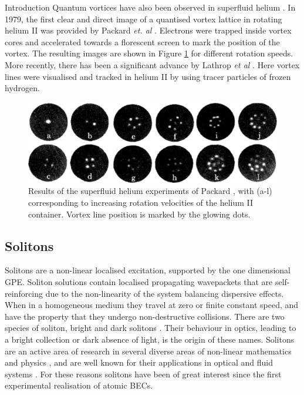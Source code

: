 \begin{chapter}{\label{cha:bose_gases}Introduction}
Quantum vortices have also been observed in superfluid helium \cite{Vinen218}. In 1979, the first clear and direct image of a quantised vortex lattice in rotating helium II was provided by Packard {\it et. al} \cite{PhysRevLett.43.214}. Electrons were trapped inside vortex cores and accelerated towards a florescent screen to mark the position of the vortex. The resulting images are shown in Figure \ref{fig:hevorts} for different rotation speeds. More recently, there has been a significant advance by Lathrop {\it et al} \cite{Bewley09}. Here vortex lines were visualised and tracked in helium II by using tracer particles of frozen hydrogen.

\begin{figure}
\includegraphics[width=\linewidth]{intro/packard}
\caption{\label{fig:hevorts} Results of the superfluid helium experiments of Packard \cite{PhysRevLett.43.214}, with (a-l) corresponding to increasing rotation velocities of the helium II container. Vortex line position is marked by the glowing dots.}
\end{figure}

\subsection{Solitons}
Solitons are a non-linear localised excitation, supported by the one dimensional GPE. Soliton solutions contain localised propagating wavepackets that are self-reinforcing due to the non-linearity of the system balancing dispersive effects. When in a homogeneous medium they travel at zero or finite constant speed, and have the property that they undergo non-destructive collisions. There are two species of soliton, bright \cite{PhysRevA.62.063611} and dark solitons \cite{PhysRevA.62.063610}. Their behaviour in optics, leading to a bright collection or dark absence of light, is the origin of these names. Solitons are an active area of research in several diverse areas of non-linear mathematics and physics \cite{drazin1989solitons,remoissenet2013waves}, and are well known for their applications in optical and fluid systems \cite{yu_kivshar_1998}. For these reasons solitons have been of great interest \cite{kevrekidis2007emergent,1751-8121-43-21-213001} since the first experimental realisation of atomic BECs.


\end{chapter}
